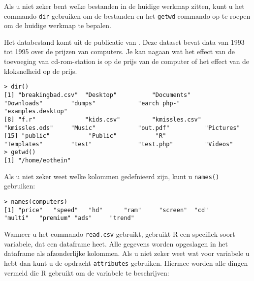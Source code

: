Als u niet zeker bent welke bestanden in de huidige werkmap zitten, kunt u het commando \texttt{dir}  gebruiken om de bestanden en het  \texttt{getwd} commando op te roepen om de huidige werkmap te bepalen.

Het databestand komt uit de publicatie van \autocite{Stengos2005}. Deze dataset bevat data van 1993 tot 1995 over de prijzen van computers. Je kan nagaan wat het effect van de toevoeging van cd-rom-station is op de prijs van de computer of  het effect van de kloksnelheid op de prijs. 

\begin{lstlisting}
> dir()
[1] "breakingbad.csv"  "Desktop"          "Documents"        "Downloads"        "dumps"            "earch php-"       "examples.desktop"
[8] "f.r"              "kids.csv"         "kmissles.csv"     "kmissles.ods"     "Music"            "out.pdf"          "Pictures"        
[15] "public"           "Public"           "R"                "Templates"        "test"             "test.php"         "Videos"          
> getwd()
[1] "/home/eothein"
\end{lstlisting}
Als u niet zeker weet welke kolommen gedefnieerd zijn, kunt u  \texttt{names()} gebruiken:


\begin{lstlisting}
> names(computers)
[1] "price"   "speed"   "hd"      "ram"     "screen"  "cd"      "multi"   "premium" "ads"     "trend"
\end{lstlisting}

 Wanneer u het commando \texttt{read.csv} gebruikt, gebruikt R een specifiek soort variabele, dat een dataframe heet. Alle gegevens worden opgeslagen in het dataframe als afzonderlijke kolommen. Als u niet zeker weet wat voor variabele u hebt dan kunt u de opdracht \texttt{attributes} gebruiken. Hiermee worden alle dingen vermeld die R gebruikt om de variabele te beschrijven:

